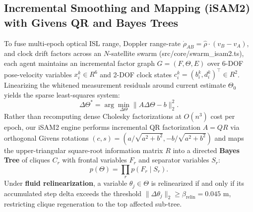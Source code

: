 \documentclass[11pt,a4paper,reqno]{article}
\def\bm#1{#1}%
\def\texttt#1{#1}%
\def\mathcal#1{#1}%
\def\mathbb#1{#1}%
\theoremstyle{plain}
\theoremstyle{definition}
\theoremstyle{remark}
\numberwithin{equation}{section}
\begin{document}
\subsection{Incremental Smoothing and Mapping (iSAM2) with Givens QR and Bayes Trees}
To fuse multi-epoch optical ISL range, Doppler range-rate $\dot{\rho}_{AB} = \hat{\bm{\rho}} \cdot (\bm{v}_B - \bm{v}_A)$, and clock drift factors across an $N$-satellite swarm (\texttt{src/core/swarm\_isam2.ts}), each agent maintains an incremental factor graph $G = (\mathcal{F}, \Theta, \mathcal{E})$ over 6-DOF pose-velocity variables $\bm{x}_i^k \in \mathbb{R}^6$ and 2-DOF clock states $\bm{c}_i^k = (b_i^k, d_i^k)^\top \in \mathbb{R}^2$. Linearizing the whitened measurement residuals around current estimate $\Theta_0$ yields the sparse least-squares system:
\begin{equation}
  \Delta\Theta^* = \arg\min_{\Delta\Theta} \|\bm{A}\Delta\Theta - \bm{b}\|_2^2.
  \label{eq:isam2_lsq}
\end{equation}
Rather than recomputing dense Cholesky factorizations at $\mathcal{O}(n^3)$ cost per epoch, our iSAM2 engine performs incremental QR factorization $\bm{A} = \bm{Q}\bm{R}$ via orthogonal Givens rotations $(c, s) = (a/\sqrt{a^2+b^2}, -b/\sqrt{a^2+b^2})$ and maps the upper-triangular square-root information matrix $\bm{R}$ into a directed \textbf{Bayes Tree} of cliques $\mathcal{C}_r$ with frontal variables $\bm{F}_r$ and separator variables $\bm{S}_r$:
\begin{equation}
  p(\Theta) = \prod_{r} p(\bm{F}_r \mid \bm{S}_r).
  \label{eq:bayes_tree_density}
\end{equation}
Under \textbf{fluid relinearization}, a variable $\theta_j \in \Theta$ is relinearized if and only if its accumulated step delta exceeds the threshold $\|\Delta\theta_j\|_2 \ge \beta_{\text{relin}} = 0.045\text{ m}$, restricting clique regeneration to the top affected sub-tree.
\end{document}
